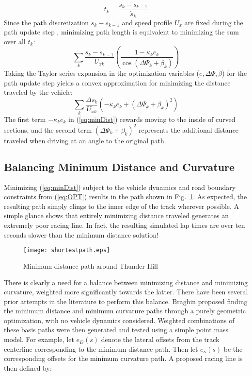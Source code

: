 \begin{equation}
t_k = \frac{s_k - s_{k-1}}{\dot{s}_k}
\end{equation}
Since the  path discretization $s_k - s_{k-1}$ and speed profile $U_x$ are fixed during the path update step , minimizing path length is equivalent to
minimizing the sum over all $t_k$:
\begin{equation}
	\sum_k \frac{s_k-s_{k-1}}{U_{xk}} \left(\frac{1-\kappa_ke_k}{\cos(\Delta \Psi_k + \beta_k)}\right)
\end{equation}
Taking the Taylor series expansion in the optimization variables ($e, \Delta\Psi, \beta$) for the path update step yields a convex approximation
 for minimizing the distance
traveled by the vehicle:
\begin{equation}
	\label{eq:minDist}
	\sum_k \frac{\Delta s_k}{U_{xk}} \left(-\kappa_ke_k + (\Delta\Psi_k + \beta_k)^2\right)
\end{equation}
The first term $-\kappa_ke_k$ in (\ref{eq:minDist}) rewards moving to the inside of curved sections, and the
second term $(\Delta\Psi_k + \beta_k)^2$ represents the additional distance traveled when driving at an angle to the original path.  

\subsection{Balancing Minimum Distance and Curvature}
\label{sec:ch3balance}

Minimizing (\ref{eq:minDist}) subject to the vehicle dynamics and road boundary constraints from (\ref{eq:OPT}) results in the path shown in Fig.~\ref{fig:minDist}.
As expected, the resulting path simply clings to the inner edge of the track wherever possible. A simple glance shows that entirely minimizing
distance traveled generates an extremely poor racing line. In fact, the resulting simulated lap times are over ten seconds slower than the minimum distance
solution! 

 \begin{figure}
\centering
\texttt{[image: shortestpath.eps]}
\caption{Minimum distance path around Thunder Hill}
\label{fig:minDist}
\end{figure}

There is clearly a need for a balance between minimizing distance and minimizing curvature, weighted more significantly towards the latter. There have been
several prior attempts in the literature to perform this balance. Braghin \cite{braghin} proposed finding the minimum distance and minimum curvature paths through 
a purely geometric optimization, with no vehicle dynamics considered. Weighted combinations of these
basis paths were then generated and tested using a simple point mass model. For example, let $e_D(s)$ denote the lateral offsets from the track centerline corresponding to the minimum
distance path. Then let $e_\kappa(s)$ be the corresponding offsets for the minimum curvature path. A proposed racing line is then defined by:


